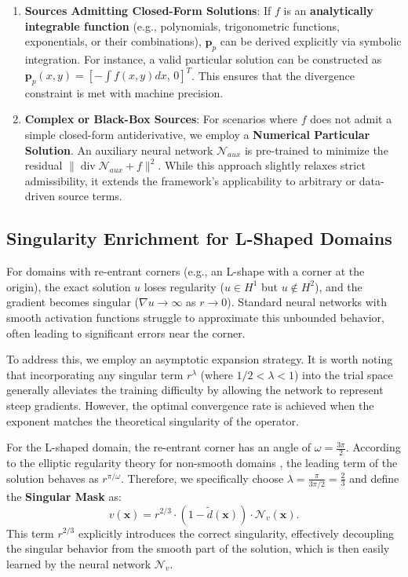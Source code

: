 \documentclass[12pt, a4paper]{article}
\DeclareMathOperator{\divg}{div}
\begin{document}
\begin{enumerate}
    \item \textbf{Sources Admitting Closed-Form Solutions}:
    If $f$ is an \textbf{analytically integrable function} (e.g., polynomials, trigonometric functions, exponentials, or their combinations), $\mathbf{p}_p$ can be derived explicitly via symbolic integration. For instance, a valid particular solution can be constructed as $\mathbf{p}_p(x,y) = [-\int f(x,y) dx, \, 0]^T$. This ensures that the divergence constraint is met with machine precision.

    \item \textbf{Complex or Black-Box Sources}:
    For scenarios where $f$ does not admit a simple closed-form antiderivative, we employ a \textbf{Numerical Particular Solution}. An auxiliary neural network $\mathcal{N}_{aux}$ is pre-trained to minimize the residual $\| \divg \mathcal{N}_{aux} + f \|^2$. While this approach slightly relaxes strict admissibility, it extends the framework's applicability to arbitrary or data-driven source terms.
\end{enumerate}

\subsection{Singularity Enrichment for L-Shaped Domains}
For domains with re-entrant corners (e.g., an L-shape with a corner at the origin), the exact solution $u$ loses regularity ($u \in H^1$ but $u \notin H^2$), and the gradient becomes singular ($\nabla u \to \infty$ as $r \to 0$). Standard neural networks with smooth activation functions struggle to approximate this unbounded behavior, often leading to significant errors near the corner.

To address this, we employ an asymptotic expansion strategy. It is worth noting that incorporating any singular term $r^\lambda$ (where $1/2 < \lambda < 1$) into the trial space generally alleviates the training difficulty by allowing the network to represent steep gradients. However, the optimal convergence rate is achieved when the exponent matches the theoretical singularity of the operator.

For the L-shaped domain, the re-entrant corner has an angle of $\omega = \frac{3\pi}{2}$. According to the elliptic regularity theory for non-smooth domains \cite{grisvard1985, strang1973}, the leading term of the solution behaves as $r^{\pi/\omega}$. Therefore, we specifically choose $\lambda = \frac{\pi}{3\pi/2} = \frac{2}{3}$ and define the \textbf{Singular Mask} as:
\begin{equation}
    v(\mathbf{x}) = r^{2/3} \cdot (1 - \tilde{d}(\mathbf{x})) \cdot \mathcal{N}_v(\mathbf{x}).
\end{equation}
This term $r^{2/3}$ explicitly introduces the correct singularity, effectively decoupling the singular behavior from the smooth part of the solution, which is then easily learned by the neural network $\mathcal{N}_v$.
\end{document}
